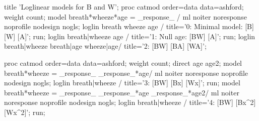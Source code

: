 \begin{listing}
title 'Loglinear models for B and W';   
proc catmod order=data data=ashford;
   weight count;
   model breath*wheeze*age = _response_ / 
      ml noiter noresponse noprofile nodesign nogls;
   loglin breath wheeze age / title='0: Minimal model: [B] [W] [A]';
run;
   loglin breath|wheeze age / title='1: Null age: [BW] [A]';
run;
   loglin breath|wheeze breath|age wheeze|age/ title='2: [BW] [BA] [WA]';

proc catmod order=data data=ashford;
   weight count;
   direct age age2;
   model breath*wheeze = _response_ _response_*age/ 
      ml noiter noresponse noprofile nodesign nogls;
   loglin breath|wheeze / title='3: [BW] [Bx] [Wx]';
run;
   model breath*wheeze = _response_ _response_*age _response_*age2/ 
      ml noiter noresponse noprofile nodesign nogls;
   loglin breath|wheeze / title='4: [BW] [Bx^2] [Wx^2]';
run;

\end{listing}
